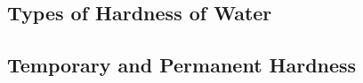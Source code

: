 \begin{multicols}{2}
\vfill
\columnbreak


\section*{Types of Hardness of Water}


\subsection{Temporary and Permanent Hardness}



\end{multicols}
